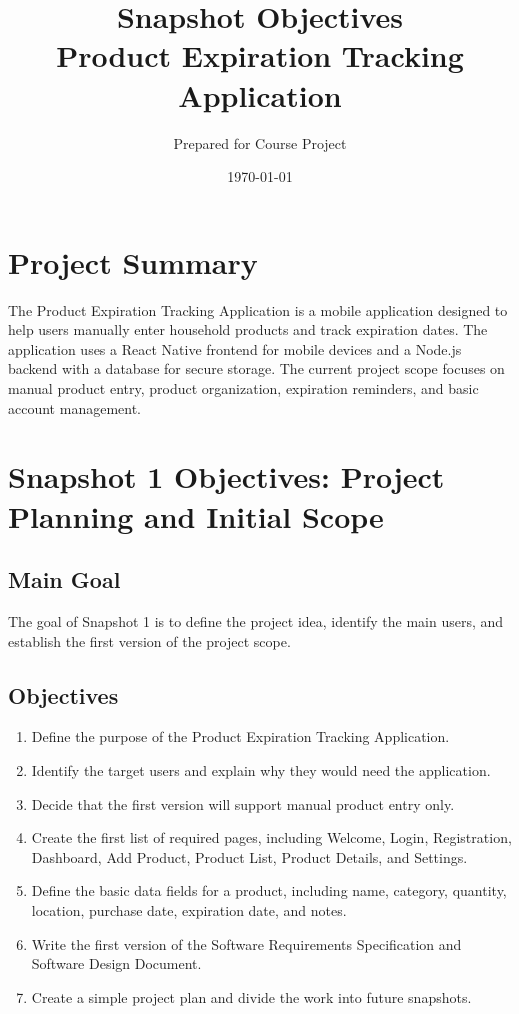 \documentclass[12pt]{article}
\title{Snapshot Objectives\\Product Expiration Tracking Application}
\author{Prepared for Course Project}
\date{\today}
\begin{document}
\maketitle
\newpage
\tableofcontents
\newpage

\section{Project Summary}

The Product Expiration Tracking Application is a mobile application designed to help users manually enter household products and track expiration dates. The application uses a React Native frontend for mobile devices and a Node.js backend with a database for secure storage. The current project scope focuses on manual product entry, product organization, expiration reminders, and basic account management.

\section{Snapshot 1 Objectives: Project Planning and Initial Scope}

\subsection{Main Goal}
The goal of Snapshot 1 is to define the project idea, identify the main users, and establish the first version of the project scope.

\subsection{Objectives}
\begin{enumerate}[leftmargin=*]
    \item Define the purpose of the Product Expiration Tracking Application.
    \item Identify the target users and explain why they would need the application.
    \item Decide that the first version will support manual product entry only.
    \item Create the first list of required pages, including Welcome, Login, Registration, Dashboard, Add Product, Product List, Product Details, and Settings.
    \item Define the basic data fields for a product, including name, category, quantity, location, purchase date, expiration date, and notes.
    \item Write the first version of the Software Requirements Specification and Software Design Document.
    \item Create a simple project plan and divide the work into future snapshots.
\end{enumerate}
\end{document}
